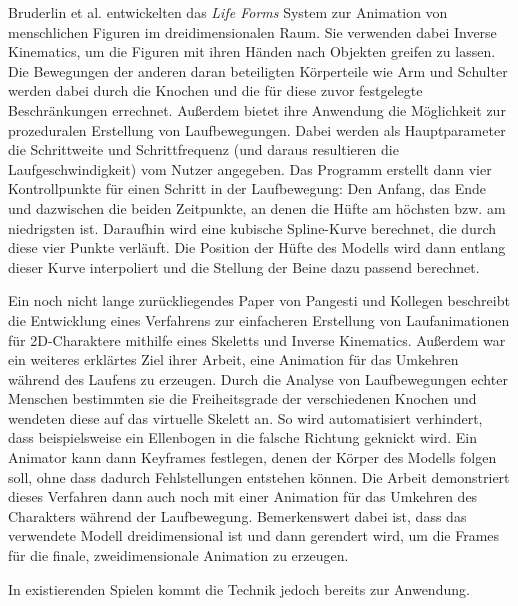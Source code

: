 Bruderlin et al. \cite{bruderlin1994procedural} entwickelten das \textit{Life Forms} System zur Animation von menschlichen Figuren im dreidimensionalen Raum. Sie verwenden dabei Inverse Kinematics, um die Figuren mit ihren Händen nach Objekten greifen zu lassen. Die Bewegungen der anderen daran beteiligten Körperteile wie Arm und Schulter werden dabei durch die Knochen und die für diese zuvor festgelegte Beschränkungen errechnet. Außerdem bietet ihre Anwendung die Möglichkeit zur prozeduralen Erstellung von Laufbewegungen. Dabei werden als Hauptparameter die Schrittweite und Schrittfrequenz (und daraus resultieren die Laufgeschwindigkeit) vom Nutzer angegeben. Das Programm erstellt dann vier Kontrollpunkte für einen Schritt in der Laufbewegung: Den Anfang, das Ende und dazwischen die beiden Zeitpunkte, an denen die Hüfte am höchsten bzw. am niedrigsten ist. Daraufhin wird eine kubische Spline-Kurve berechnet, die durch diese vier Punkte verläuft. Die Position der Hüfte des Modells wird dann entlang dieser Kurve interpoliert und die Stellung der Beine dazu passend berechnet.

Ein noch nicht lange zurückliegendes Paper von Pangesti und Kollegen \cite{pangesti2019analysis} beschreibt die Entwicklung eines Verfahrens zur einfacheren Erstellung von Laufanimationen für 2D-Charaktere mithilfe eines Skeletts und Inverse Kinematics. Außerdem war ein weiteres erklärtes Ziel ihrer Arbeit, eine Animation für das Umkehren während des Laufens zu erzeugen. Durch die Analyse von Laufbewegungen echter Menschen bestimmten sie die Freiheitsgrade der verschiedenen Knochen und wendeten diese auf das virtuelle Skelett an. So wird automatisiert verhindert, dass beispielsweise ein Ellenbogen in die falsche Richtung geknickt wird. Ein Animator kann dann Keyframes festlegen, denen der Körper des Modells folgen soll, ohne dass dadurch Fehlstellungen entstehen können. Die Arbeit demonstriert dieses Verfahren dann auch noch mit einer Animation für das Umkehren des Charakters während der Laufbewegung. Bemerkenswert dabei ist, dass das verwendete Modell dreidimensional ist und dann gerendert wird, um die Frames für die finale, zweidimensionale Animation zu erzeugen. 


In existierenden Spielen kommt die Technik jedoch bereits zur Anwendung.
